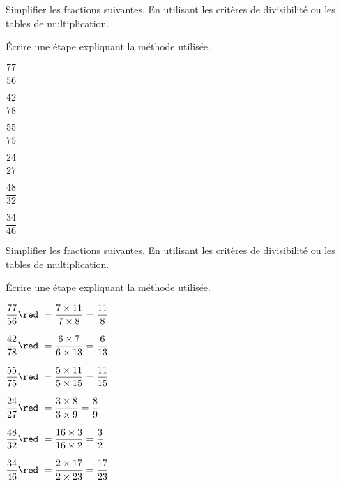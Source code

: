 \begin{exercice*}
    Simplifier les fractions suivantes. En utilisant les critères de divisibilité ou les tables de multiplication.

    Écrire une étape expliquant la méthode utilisée.    
    \begin{multicols}{3}
        \begin{enumerate}
            \begin{spacing}{1.5}
                \item $\dfrac{77}{56}$
                \item $\dfrac{42}{78}$
                \item $\dfrac{55}{75}$
                \item $\dfrac{24}{27}$
                \item $\dfrac{48}{32}$
                \item $\dfrac{34}{46}$
            \end{spacing}
        \end{enumerate}            
    \end{multicols}    
\end{exercice*}
\begin{corrige}
    Simplifier les fractions suivantes. En utilisant les critères de divisibilité ou les tables de multiplication.

    Écrire une étape expliquant la méthode utilisée.
    \begin{multicols}{2}
        \begin{enumerate}
            \begin{spacing}{1.5}
                \item $\dfrac{77}{56} {\red ~= \dfrac{7\times11}{7\times8} = \dfrac{11}{8}  }$
                \item $\dfrac{42}{78} {\red ~= \dfrac{6\times7}{6\times13} = \dfrac{6}{13}  }$
                \item $\dfrac{55}{75} {\red ~= \dfrac{5\times11}{5\times15} = \dfrac{11}{15}}$
                \item $\dfrac{24}{27} {\red ~= \dfrac{3\times8}{3\times9} = \dfrac{8}{9}    }$
                \item $\dfrac{48}{32} {\red ~= \dfrac{16\times3}{16\times2} = \dfrac{3}{2}  }$
                \item $\dfrac{34}{46} {\red ~= \dfrac{2\times17}{2\times23} = \dfrac{17}{23}}$
            \end{spacing}
        \end{enumerate}            
    \end{multicols}
\end{corrige}

